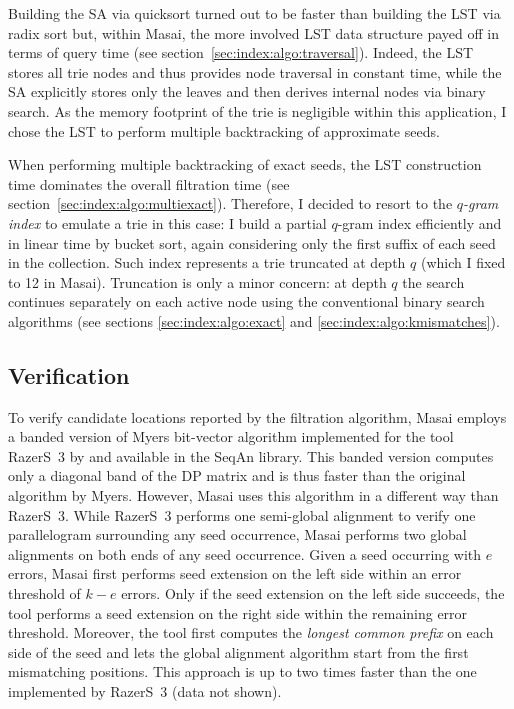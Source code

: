 Building the SA via quicksort turned out to be faster than building the LST via radix sort but, within Masai, the more involved LST data structure payed off in terms of query time (see section~\ref{sec:index:algo:traversal}).
Indeed, the LST stores all trie nodes and thus provides node traversal in constant time, while the SA explicitly stores only the leaves and then derives internal nodes via binary search.
As the memory footprint of the trie is negligible within this application, I chose the LST to perform multiple backtracking of approximate seeds.

When performing multiple backtracking of exact seeds, the LST construction time dominates the overall filtration time (see section~\ref{sec:index:algo:multiexact}).
Therefore, I decided to resort to the \emph{$q$-gram index} to emulate a trie in this case:
I build a partial $q$-gram index efficiently and in linear time by bucket sort, again considering only the first suffix of each seed in the collection.
Such index represents a trie truncated at depth $q$ (which I fixed to 12 in Masai).
Truncation is only a minor concern: at depth $q$ the search continues separately on each active node using the conventional binary search algorithms (see sections \ref{sec:index:algo:exact} and \ref{sec:index:algo:kmismatches}).

\subsection{Verification}
\label{masai:engineering:extension}

To verify candidate locations reported by the filtration algorithm, Masai employs a banded version of Myers bit-vector algorithm \citep{Myers1999} implemented for the tool RazerS~3 by \citeauthor{Weese2012} and available in the SeqAn library.
This banded version computes only a diagonal band of the DP matrix and is thus faster than the original algorithm by Myers.
However, Masai uses this algorithm in a different way than RazerS~3.
While RazerS~3 performs one semi-global alignment to verify one parallelogram surrounding any seed occurrence, Masai performs two global alignments on both ends of any seed occurrence.
Given a seed occurring with $e$ errors, Masai first performs seed extension on the left side within an error threshold of $k - e$ errors.
Only if the seed extension on the left side succeeds, the tool performs a seed extension on the right side within the remaining error threshold.
Moreover, the tool first computes the \emph{longest common prefix} on each side of the seed and lets the global alignment algorithm start from the first mismatching positions.
This approach is up to two times faster than the one implemented by RazerS~3 (data not shown).

